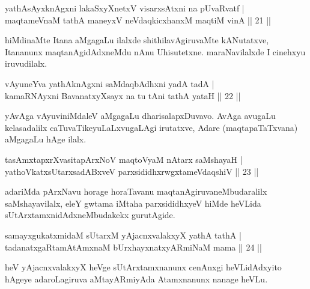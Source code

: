 
\begin{shl}
yathA\s sAyxknAgxni lakaSxyXnetxV visarxsAtxni na pUvaRvatf |\\
maqtameVnaM tathA maneyxV neVdaqkicxhanxM maqtiM vinA \hfill || 21 ||
\end{shl}

\begin{artha}
hiMdinaMte Itana aMgagaLu ilalxde shithilavAgiruvaMte kANutatxve, Itananunx maqtanAgidAdxneMdu nAnu Uhisutetxne. maraNavilalxde I cinehxyu iruvudilalx.
\end{artha}

\begin{shl}
vAyuneYva yathA\s knAgxni saMdaqbAdhxni yadA tadA |\\
kamaRNAyxni BavanatxyXsayx na tu tAni tathA yataH \hfill || 22 ||
\end{shl}

\begin{artha}
yAvAga vAyuviniMdaleV aMgagaLu dharisalapxDuvavo. AvAga avugaLu kelasadalilx caTuvaTikeyuLaLxvugaLAgi irutatxve, Adare (maqtapaTaTxvana) aMgagaLu hAge ilalx.
\end{artha}

\begin{shl}
tasAmxtapxrXvasitapArxNoV maqtoV\s yaM nAtarx saMshayaH |\\
yathoVkatxsUtarxsadABxveV parxsididhxrwgxtameVdaqshiV \hfill || 23 ||
\end{shl}

\begin{artha}%
adariMda pArxNavu horage horaTavanu maqtanAgiruvaneMbudaralilx saMshaya\-vilalx, eleY gwtama iMtaha parxsididhxyeV hiMde heVLida sUtArxtamxnidAdxneMbudakekx gurutAgide.
\end{artha}

\begin{shl}
samayxgukatxmidaM sUtarxM yAjacnxvalakxyX yathA tathA |\\
tadanatxgaRtamAtAmxnaM bUrxhayxnatxyARmiNaM mama \hfill || 24 ||
\end{shl}

\begin{artha}
heV yAjacnxvalakxyX heVge sUtArxtamxnanunx cenAnxgi heVLidAdxyito hAgeye adaroLagiruva aMtayARmiyAda Atamxnanunx nanage heVLu.
\end{artha}


